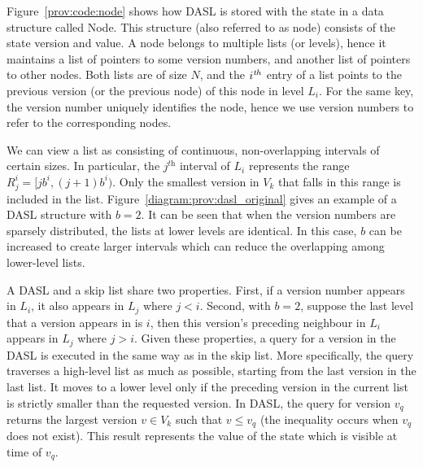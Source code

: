 Figure~\ref{prov:code:node} shows how DASL is stored with the state in a data structure called Node.  This structure
(also referred to as node) consists of the state version and value. A node belongs to multiple lists (or
levels), hence it maintains  a list of pointers to some version numbers, and another list of pointers to other
nodes.  Both lists are of size $N$, and the $i^{\textit th}$ entry of a list points to the previous version
(or the previous node) of this node in level $L_i$.  For the same key, the version number uniquely identifies
the node, hence we use version numbers to refer to the corresponding nodes.

We can view a list as consisting of continuous, non-overlapping intervals of certain sizes. In particular, the
$j^{\textit{th}}$ interval of $L_i$ represents the range $R^i_j = [jb^i, (j+1)b^i)$. Only the smallest version in $V_k$ that
falls in this range is included in the list. Figure~\ref{diagram:prov:dasl_original} gives an example of a DASL
structure with $b=2$. It can be seen that when the version numbers are sparsely distributed, the lists at lower levels are
identical. In this case, $b$ can be increased to create larger intervals which can reduce the overlapping among
lower-level lists.   

A DASL and a skip list share two properties. First, if a version number appears in $L_i$, it also appears in
$L_j$ where $j<i$.  Second, with $b=2$, suppose the last level that a version appears in is $i$, then this
version's preceding neighbour in $L_i$ appears in $L_j$ where $j>i$. 
Given these properties,
a query for a version in the DASL is executed in the same way as in the skip list.
More specifically, the query traverses a high-level list as much as possible, starting from
the last version in the last list. It moves to a lower level only if the preceding version in the current list
is strictly smaller than the requested version. In DASL, the query for version $v_q$ returns the largest
version $v \in V_k$ such that $v \leq v_q$ (the inequality occurs when $v_q$ does not exist). This result
represents the value of the state which is visible at time of $v_q$. 

